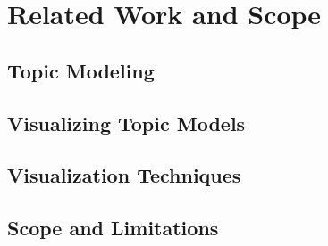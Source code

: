 \chapter{Related Work and Scope}



\section{Topic Modeling}



\section{Visualizing Topic Models}



\section{Visualization Techniques}



\section{Scope and Limitations}


